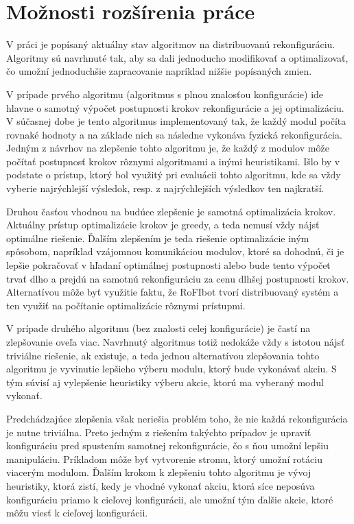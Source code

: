 \documentclass[
  digital, %
  oneside, %
  notable,   %
  lof,     %
  nolot,     %
]{fithesis3}
\begin{document}
\section{Možnosti rozšírenia práce}
\label{sec:future}
V práci je popísaný aktuálny stav algoritmov na distribuovanú rekonfiguráciu. Algoritmy sú navrhnuté tak, aby sa dali jednoducho modifikovať a optimalizovať, čo umožní jednoduchšie zapracovanie napríklad nižšie popísaných zmien. 

V prípade prvého algoritmu (algoritmus s plnou znalosťou konfigurácie) ide hlavne o samotný výpočet postupnosti krokov rekonfigurácie a jej optimalizáciu. V súčasnej dobe je tento algoritmus implementovaný tak, že každý modul počíta rovnaké hodnoty a na základe nich sa následne vykonáva fyzická rekonfigurácia. Jedným z návrhov na zlepšenie tohto algoritmu je, že každý z modulov môže počítať postupnosť krokov rôznymi algoritmami a inými heuristikami. Išlo by v podstate o prístup, ktorý bol využitý pri evaluácii tohto algoritmu, kde sa vždy vyberie najrýchlejší výsledok, resp. z najrýchlejších výsledkov ten najkratší. 

Druhou časťou vhodnou na budúce zlepšenie je samotná optimalizácia krokov. Aktuálny prístup optimalizácie krokov je greedy, a teda nemusí vždy nájsť optimálne riešenie. Ďalším zlepšením je teda riešenie optimalizácie iným spôsobom, napríklad vzájomnou komunikáciou modulov, ktoré sa dohodnú, či je lepšie pokračovať v hľadaní optimálnej postupnosti alebo bude tento výpočet trvať dlho a prejdú na samotnú rekonfiguráciu za cenu dlhšej postupnosti krokov. Alternatívou môže byť využitie faktu, že RoFIbot tvorí distribuovaný systém a ten využiť na počítanie optimalizácie rôznymi prístupmi. 

V prípade druhého algoritmu (bez znalosti celej konfigurácie) je častí na zlepšovanie oveľa viac. Navrhnutý algoritmus totiž nedokáže vždy s istotou nájsť triviálne riešenie, ak existuje, a teda jednou alternatívou zlepšovania tohto algoritmu je vyvinutie lepšieho výberu modulu, ktorý bude vykonávať akciu. S tým súvisí aj vylepšenie heuristiky výberu akcie, ktorú ma vyberaný modul vykonať. 

Predchádzajúce zlepšenia však neriešia problém toho, že nie každá rekonfigurácia je nutne triviálna. Preto jedným z riešením takýchto prípadov je upraviť konfiguráciu pred spustením samotnej rekonfigurácie, čo s ňou umožní lepšiu manipuláciu. Príkladom môže byť vytvorenie stromu, ktorý umožní rotáciu viacerým modulom. Ďalším krokom k zlepšeniu tohto algoritmu je vývoj heuristiky, ktorá zistí, kedy je vhodné vykonať akciu, ktorá síce neposúva konfiguráciu priamo k cieľovej konfigurácii, ale umožní tým ďalšie akcie, ktoré môžu viesť k cieľovej konfigurácii. 
\end{document}
